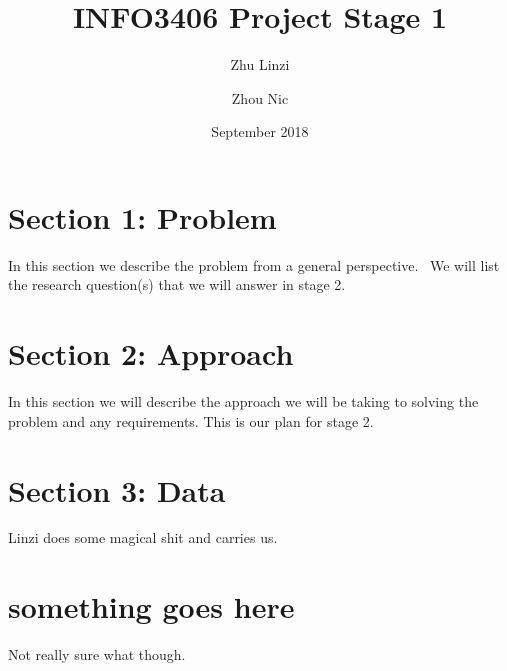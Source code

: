 \documentclass[12pt,a4paper]{article}
\begin{document}
\begin{titlepage}
    \title{INFO3406 Project Stage 1}
    \author{Zhu Linzi\\
            \and
            Zhou Nic
    }
    \date{September 2018}
    \maketitle
\end{titlepage}

    \pagebreak
    \tableofcontents
    \pagebreak

    \section{Section 1: Problem}
    In this section we describe the problem from a general perspective. \
    We will list the research question(s) that we will answer in stage 2.

    \section{Section 2: Approach}
    In this section we will describe the approach we will be taking to solving the problem and any requirements. This is our plan for stage 2.

    \section{Section 3: Data}
    Linzi does some magical shit and carries us.

    \appendix
    \section{something goes here}
    Not really sure what though.
\end{document}
